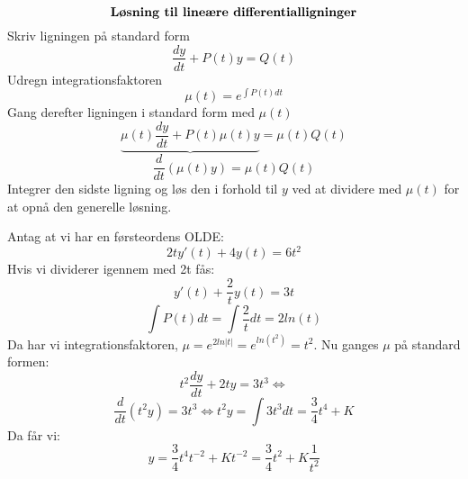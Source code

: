 \begin{tcolorbox}
\begin{equation}\label{LLD}
\textbf{Løsning til lineære differentialligninger}\\
\end{equation}
\hfill \break
Skriv ligningen på standard form $$\frac{dy}{dt}+P(t)y=Q(t)$$ Udregn integrationsfaktoren $$\mu (t)=e^{\int P(t)dt}$$ Gang derefter ligningen i standard form med $\mu (t)$ $$\underbrace{\mu (t)\frac{dy}{dt}+P(t)\mu (t)y} = \mu (t)Q(t)$$ $$\frac{d}{dt}(\mu (t)y) = \mu (t)Q(t)$$ Integrer den sidste ligning og løs den i forhold til $y$ ved at dividere med $\mu (t)$ for at opnå den generelle løsning. 
\end{tcolorbox}

\begin{Example}
\textnormal{Antag at vi har en førsteordens OLDE:}
$$2ty'(t) + 4y(t) = 6t^2$$
\textnormal{Hvis vi dividerer igennem med 2t fås:}
$$y'(t) + \frac{2}{t}y(t) = 3t$$
$$\int P(t)dt = \int \frac{2}{t}dt = 2ln(t)$$
\textnormal{Da har vi integrationsfaktoren,} $\mu = e^{2ln|t|} = e^{ln(t^2)} = t^2$. \textnormal{Nu ganges $\mu$ på standard formen:}
$$t^2 \frac{dy}{dt} + 2ty = 3t^3\Leftrightarrow$$
$$\frac{d}{dt}(t^2y) = 3t^3 \Leftrightarrow  t^2y = \int 3t^3dt = \frac{3}{4}t^4 + K$$
\textnormal{Da får vi:} 
$$y = \frac{3}{4}t^4t^{-2} + Kt^{-2} = \frac{3}{4}t^2 + K \frac{1}{t^2}$$
\end{Example}


